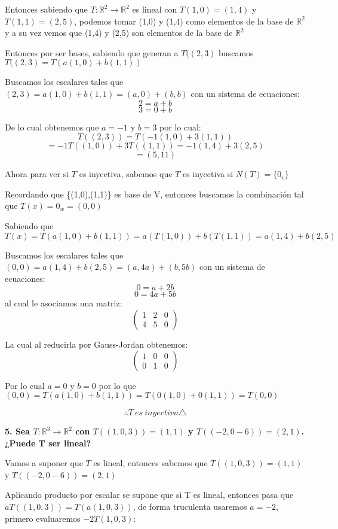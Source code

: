 \documentclass{article}
\begin{document}
Entonces sabiendo que $T: \mathbb{R}^2 \rightarrow \mathbb{R}^2$ es lineal con $T(1,0)=(1,4)$ y $T(1,1)=(2,5)$, podemos tomar (1,0) y (1,4) como elementos de la base de $\mathbb{R}^2$ y a su vez vemos que (1,4) y (2,5) son elementos de la base de $\mathbb{R}^2$

Entonces por ser bases, sabiendo que generan a $T((2,3)$ buscamos $T((2,3)= T(a(1,0)+b(1,1))$

Buscamos los escalares tales que $(2,3)=a(1,0)+b(1,1)=(a,0)+(b,b)$ con un sistema de ecuaciones: $$2=a+b$$ $$3=0+b$$ 

De lo cual obtenemos que $a=-1$ y $b=3$ por lo cual: $$T((2,3))=T(-1(1,0)+3(1,1))$$$$=-1T((1,0))+3T((1,1))=-1(1,4)+3(2,5)$$$$=(5,11)$$

Ahora para ver si $T$ es inyectiva, sabemos que $T$ es inyectiva si $N(T)=\{0_{v}\}$

Recordando que \{(1,0),(1,1)\} es base de V, entonces buscamos la combinación tal que $T(x)=0_{w}=(0,0)$

Sabiendo que $T(x)=T(a(1,0)+b(1,1))=a(T(1,0))+b(T(1,1))=a(1,4)+b(2,5)$

Buscamos los escalares tales que $(0,0)=a(1,4)+b(2,5)=(a,4a)+(b,5b)$ con un sistema de ecuaciones: $$0=a+2b$$ $$0=4a+5b$$ al cual le asociamos una matriz:
\begin{equation}
\begin{pmatrix}
1 & 2 & 0\\
4 & 5 & 0
\end{pmatrix}
\end{equation}

La cual al reducirla por Gauss-Jordan obtenemos:
\begin{equation}
\begin{pmatrix}
1 & 0 & 0\\
0 & 1 & 0
\end{pmatrix}
\end{equation}

Por lo cual $a=0$ y $b=0$  por lo que $(0,0)=T(a(1,0)+b(1,1))=T(0(1,0)+0(1,1))=T(0,0)$

$$\therefore T\ es\ inyectiva\triangle$$

\textbf{5. Sea $T: \mathbb{R}^3 \rightarrow \mathbb{R}^2$ con $T((1,0,3))=(1,1)$ y $T((-2,0-6))=(2,1)$. ¿Puede T ser lineal?}

Vamos a suponer que $T$ es lineal, entonces sabemos que $T((1,0,3))=(1,1)$ y $T((-2,0-6))=(2,1)$

Aplicando producto por escalar se supone que si T es lineal, entonces pasa que $aT((1,0,3))=T(a(1,0,3))$, de forma truculenta usaremos $a = -2$, primero evaluaremos $-2T(1,0,3)$:
\end{document}
